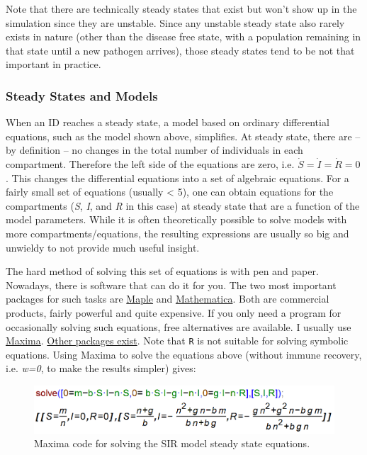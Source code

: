 \documentclass[]{book}
\theoremstyle{definition}
\theoremstyle{definition}
\theoremstyle{definition}
\theoremstyle{remark}
\begin{document}
Note that there are technically steady states that exist but won't show
up in the simulation since they are unstable. Since any unstable steady
state also rarely exists in nature (other than the disease free state,
with a population remaining in that state until a new pathogen arrives),
those steady states tend to be not that important in practice.

\subsubsection{Steady States and Models}\label{myadvancedbox}

When an ID reaches a steady state, a model based on ordinary
differential equations, such as the model shown above, simplifies. At
steady state, there are -- by definition -- no changes in the total
number of individuals in each compartment. Therefore the left side of
the equations are zero, i.e. \(\dot S = \dot I = \dot R =0\). This
changes the differential equations into a set of algebraic equations.
For a fairly small set of equations (usually \textless{} 5), one can
obtain equations for the compartments (\emph{S}, \emph{I}, and \emph{R}
in this case) at steady state that are a function of the model
parameters. While it is often theoretically possible to solve models
with more compartments/equations, the resulting expressions are usually
so big and unwieldy to not provide much useful insight.

The hard method of solving this set of equations is with pen and paper.
Nowadays, there is software that can do it for you. The two most
important packages for such tasks are
\href{http://www.maplesoft.com/}{Maple} and
\href{https://www.wolfram.com/mathematica/}{Mathematica}. Both are
commercial products, fairly powerful and quite expensive. If you only
need a program for occasionally solving such equations, free
alternatives are available. I usually use
\href{http://maxima.sourceforge.net/}{Maxima}.
\href{http://en.wikipedia.org/wiki/Comparison_of_computer_algebra_systems}{Other
packages exist}. Note that \texttt{R} is not suitable for solving
symbolic equations. Using Maxima to solve the equations above (without
immune recovery, i.e. \emph{w=0}, to make the results simpler) gives:

\begin{figure}
\centering
\includegraphics{./images/SSmaxima.png}
\caption{\label{fig:SSmaxima}Maxima code for solving the SIR model steady
state equations.}
\end{figure}
\end{document}
